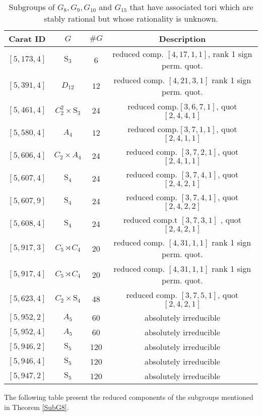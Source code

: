 \documentclass[12pt]{article}
\theoremstyle{plain}
\theoremstyle{definition}
\begin{document}
\begin{center} 
\begin{table} 
\begin{tabular}{cccc}
 Carat ID  & $G$ & $\#G$ & Description\\
\hline
 $[5,173,4]$ & $\mathrm{S}_3$ & 6 &  reduced comp. $[ 4, 17, 1, 1 ]$,  rank 1 sign perm. quot. \\
 $[5,391,4]$ &$D_{12}$ & $12$ &  reduced comp. $ [ 4, 21, 3, 1 ]$  rank 1 sign perm. quot. \\
 $[5,461,4]$ &$C^2_2 \times \mathrm{S}_3$ & 24 & reduced comp.$[3,6,7,1]$, quot $[2,4,4,1]$  \\
 $[5,580,4]$ & $A_4$ & $12$ &  reduced comp.$[3,7,1,1]$, quot $[ 2, 4, 1, 1 ]$\\
 $[5,606,4]$ & $C_2 \times A_4$ & 24 &reduced comp. $[3,7,2,1]$, quot $[ 2, 4, 1, 1 ]$ \\
 $[5,607,4]$ & $\mathrm{S}_4$ & 24 &reduced comp. $[3,7,4,1]$, quot $[ 2, 4, 2, 1 ]$ \\
 $[5,607,9]$ &$\mathrm{S}_4$ & 24 & reduced comp. $ [ 3, 7, 4, 1 ]$, quot $[ 2, 4, 2, 2 ]$ \\
 $[5,608,4]$ &$\mathrm{S}_4$ & 24 & reduced comp.t $[ 3, 7, 3, 1 ]$ , quot $[ 2, 4, 2, 1 ]$ \\
 $[5,917,3]$ &$C_5 \rtimes C_4$ & 20 &  reduced comp.  $[ 4, 31, 1, 1 ]$  rank 1 sign perm. quot. \\
 $[5,917,4]$ &$C_5 \rtimes C_4$ & 20 &  reduced comp.  $[ 4, 31, 1, 1 ]$   rank 1 sign perm. quot. \\
 $[5,623,4]$ &$C_2 \times \mathrm{S}_4$ & 48 & reduced comp. $[3,7,5,1]$, quot $[ 2, 4, 2, 1 ]$ \\
 $[5,952,2]$ &$A_5$ & 60 & absolutely irreducible \\
 $[5,952,4]$ &$A_5$ & 60 & absolutely irreducible \\
 $[5,946,2]$ &$\mathrm{S}_5$ & 120 & absolutely irreducible \\
 $[5,946,4]$ &$\mathrm{S}_5$ & 120 & absolutely irreducible \\
 $[5,947,2]$ &$\mathrm{S}_5$ & 120 & absolutely irreducible 
\end{tabular}
\caption{Subgroups of $G_8, G_9, G_{10}$ and $G_{15}$ that have associated tori which are stably rational but whose rationality is unknown.}
\label{SubIrreducible}
\end{table}
\end{center}
The following table present the reduced components of the subgroups mentioned in Theorem \ref{SubG8}.
\end{document}
